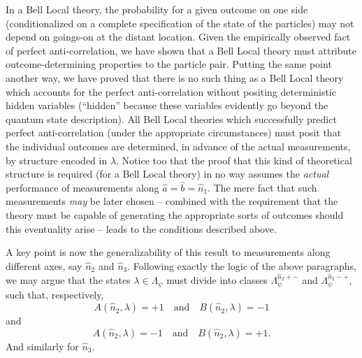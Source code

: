 \documentclass[aps,prc,onecolumn,12pt,nofootinbib]{revtex4-2}
\begin{document}
In a Bell Local theory, the probability for a given outcome on one
side (conditionalized on a complete specification of the state of the
particles) may not depend on goings-on at the distant location.  Given
the empirically observed fact of perfect anti-correlation, we have
shown that a Bell Local theory must attribute
outcome-determining properties to the particle pair.
Putting the same point another way, we have proved that there is no
such thing as a Bell Local theory which accounts for the perfect
anti-correlation without positing deterministic hidden variables
(``hidden'' because these variables evidently go beyond the quantum
state description).  All Bell Local theories which successfully
predict perfect anti-correlation (under the appropriate circumstances)
must posit that the individual
outcomes are determined, in advance of the actual measurements,
by structure encoded in $\lambda$.  Notice too that the proof that
this kind of theoretical structure is required (for a Bell Local
theory) in no way assumes the \emph{actual} performance of
measurements along $\hat{a} = \hat{b} = \hat{n}_1$.  The mere fact
that such measurements \emph{may} be later chosen  -- combined with
the requirement that the theory must be capable of generating the
appropriate sorts of outcomes should this eventuality arise -- leads
to the conditions described above.

A key point is now the generalizability of this result to measurements
along different axes, say $\hat{n}_2$ and $\hat{n}_3$.  Following
exactly the logic of the above paragraphs, we may argue that
the states $\lambda \in \Lambda_\psi $ must divide into classes
$ \Lambda^{\hat{n}_2 + - }_\psi  $ and
$ \Lambda^{\hat{n}_2 - + }_\psi  $, such that, respectively,
\begin{equation}
A(\hat{n}_2,\lambda)=+1 \quad {\mathrm{and}} \quad B(\hat{n}_2,\lambda)=-1
\end{equation}
and
\begin{equation}
A(\hat{n}_2,\lambda)=-1 \quad {\mathrm{and}} \quad B(\hat{n}_2,\lambda)=+1.
\end{equation}
And similarly for $\hat{n}_3$.
\end{document}

